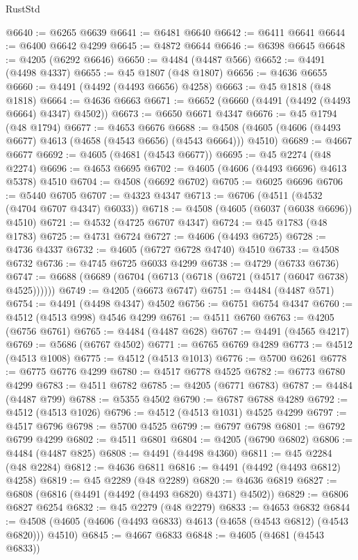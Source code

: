 \begin{lexlean}{RustStd}
\begin{coremodule}
@6640 := @6265 @6639
@6641 := @6481 @6640
@6642 := @6411 @6641
@6644 := @6400 @6642 @4299
@6645 := @4872 @6644
@6646 := @6398 @6645
@6648 := @4205 (@6292 @6646)
@6650 := @4484 (@4487 @566)
@6652 := @4491 (@4498 @4337)
@6655 := @45 @1807 (@48 @1807)
@6656 := @4636 @6655
@6660 := @4491 (@4492 (@4493 @6656) @4258)
@6663 := @45 @1818 (@48 @1818)
@6664 := @4636 @6663
@6671 := @6652 (@6660 (@4491 (@4492 (@4493 @6664) @4347) @4502))
@6673 := @6650 @6671 @4347
@6676 := @45 @1794 (@48 @1794)
@6677 := @4653 @6676
@6688 := @4508 (@4605 (@4606 (@4493 @6677) @4613 (@4658 (@4543 @6656) (@4543 @6664))) @4510)
@6689 := @4667 @6677
@6692 := @4605 (@4681 (@4543 @6677))
@6695 := @45 @2274 (@48 @2274)
@6696 := @4653 @6695
@6702 := @4605 (@4606 (@4493 @6696) @4613 @5378) @4510
@6704 := @4508 (@6692 @6702)
@6705 := @6025 @6696
@6706 := @5440 @6705
@6707 := @4323 @4347
@6713 := @6706 (@4511 (@4532 (@4704 @6707 @4347) @6033))
@6718 := @4508 (@4605 (@6037 (@6038 @6696)) @4510)
@6721 := @4532 (@4725 @6707 @4347)
@6724 := @45 @1783 (@48 @1783)
@6725 := @4731 @6724
@6727 := @4606 (@4493 @6725)
@6728 := @4736 @4337
@6732 := @4605 (@6727 @6728 @4740) @4510
@6733 := @4508 @6732
@6736 := @4745 @6725 @6033 @4299
@6738 := @4729 (@6733 @6736)
@6747 := @6688 (@6689 (@6704 (@6713 (@6718 (@6721 (@4517 (@6047 @6738) @4525))))))
@6749 := @4205 (@6673 @6747)
@6751 := @4484 (@4487 @571)
@6754 := @4491 (@4498 @4347) @4502
@6756 := @6751 @6754 @4347
@6760 := @4512 (@4513 @998) @4546 @4299
@6761 := @4511 @6760
@6763 := @4205 (@6756 @6761)
@6765 := @4484 (@4487 @628)
@6767 := @4491 (@4565 @4217)
@6769 := @5686 (@6767 @4502)
@6771 := @6765 @6769 @4289
@6773 := @4512 (@4513 @1008)
@6775 := @4512 (@4513 @1013)
@6776 := @5700 @6261
@6778 := @6775 @6776 @4299
@6780 := @4517 @6778 @4525
@6782 := @6773 @6780 @4299
@6783 := @4511 @6782
@6785 := @4205 (@6771 @6783)
@6787 := @4484 (@4487 @799)
@6788 := @5355 @4502
@6790 := @6787 @6788 @4289
@6792 := @4512 (@4513 @1026)
@6796 := @4512 (@4513 @1031) @4525 @4299
@6797 := @4517 @6796
@6798 := @5700 @4525
@6799 := @6797 @6798
@6801 := @6792 @6799 @4299
@6802 := @4511 @6801
@6804 := @4205 (@6790 @6802)
@6806 := @4484 (@4487 @825)
@6808 := @4491 (@4498 @4360)
@6811 := @45 @2284 (@48 @2284)
@6812 := @4636 @6811
@6816 := @4491 (@4492 (@4493 @6812) @4258)
@6819 := @45 @2289 (@48 @2289)
@6820 := @4636 @6819
@6827 := @6808 (@6816 (@4491 (@4492 (@4493 @6820) @4371) @4502))
@6829 := @6806 @6827 @6254
@6832 := @45 @2279 (@48 @2279)
@6833 := @4653 @6832
@6844 := @4508 (@4605 (@4606 (@4493 @6833) @4613 (@4658 (@4543 @6812) (@4543 @6820))) @4510)
@6845 := @4667 @6833
@6848 := @4605 (@4681 (@4543 @6833))

\end{coremodule}
\end{lexlean}
